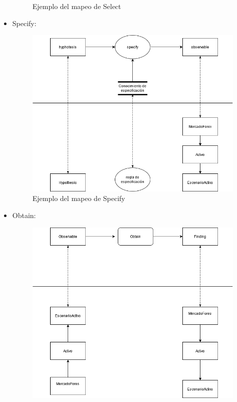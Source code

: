 \begin{itemize}
\begin{figure}[H]
    \caption{\label{fig:Select}Ejemplo del mapeo de Select}
  \end{figure}
  \item Specify: 
  \begin{figure}[H]
    \centering
    \includegraphics[scale=0.50]{imagenes/specify2.png}
    \caption{\label{fig:Specify}Ejemplo del mapeo de Specify}
  \end{figure}
  \item Obtain:  
  \begin{figure}[H]
    \centering
    \includegraphics[scale=0.50]{imagenes/obtain2.png}

\end{figure}
\end{itemize}
